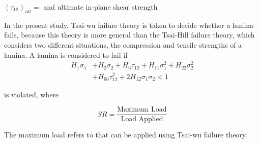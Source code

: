 $(\tau_{12})_{ult}= $ and ultimate in-plane shear strength

In the present study, Tsai-wu failure theory is taken to decide whether a lamina fails,
because this theory is more general than the Tsai-Hill failure theory, which considers two
different situations, the compression and tensile strengths of a lamina. A lamina is considered to fail
if \begin{equation} \label{eq:tsai_wu}
\begin{split}
	H_1 \sigma_1  & + H_2 \sigma_2 + H_6 \tau_{12} + H_{11}\sigma_1^2 + H_{22} \sigma_2^2 \\
				  & + H_{66}  \tau_{12}^2 + 2H_{12}\sigma_1\sigma_2 < 1
\end{split}
\end{equation}

is violated, where

\begin{equation} \label{eq:sr}S R=\frac{\text {Maximum Load}}{\text {Load Applied}}
\end{equation}

The maximum load refers to that can be applied using Tsai-wu failure theory.

